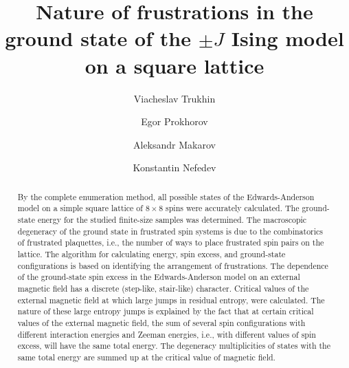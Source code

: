 \documentclass[preprint,12pt]{elsarticle}
\begin{document}
	
	\begin{frontmatter}
		
		
		\title{Nature of frustrations in the ground state of the $\pm J$ Ising model on a square lattice}
		
		\author[mainaddress, secondaryaddress]{Viacheslav Trukhin}
		
		\author[mainaddress]{Egor Prokhorov}
		
		\author[mainaddress, secondaryaddress]{Aleksandr Makarov}
		
		\author[mainaddress, secondaryaddress]{Konstantin Nefedev}
		
		
		\address[mainaddress]{Far Eastern Federal University, Vladivostok, Russky Island, 10 Ajax Bay, 690922, the Russian Federation}
		\address[secondaryaddress]{Institute of Applied Mathematics, Far Eastern Branch, Russian Academy of Science, Vladivostok, Radio 7, 690041, the Russian Federation}
		
		\begin{abstract}
			
			By the complete enumeration method, all possible states of the Edwards-Anderson model on a simple square lattice of $8 \times 8$ spins were accurately calculated. The ground-state energy for the studied finite-size samples was determined. The macroscopic degeneracy of the ground state in frustrated spin systems is due to the combinatorics of frustrated plaquettes, i.e., the number of ways to place frustrated spin pairs on the lattice. The algorithm for calculating energy, spin excess, and ground-state configurations is based on identifying the arrangement of frustrations. The dependence of the ground-state spin excess in the Edwards-Anderson model on an external magnetic field has a discrete (step-like, stair-like) character. Critical values of the external magnetic field at which large jumps in residual entropy, were calculated. The nature of these large entropy jumps is explained by the fact that at certain critical values of the external magnetic field, the sum of several spin configurations with different interaction energies and Zeeman energies, i.e., with different values of spin excess, will have the same total energy. The degeneracy multiplicities of states with the same total energy are summed up at the critical value of magnetic field.
			

\end{abstract}
\end{frontmatter}
\end{document}
